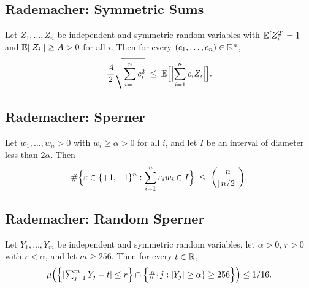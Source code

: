 \subsection{Rademacher: Symmetric Sums}

\begin{theorem}\label{thm:sym-khintchine-app}
Let $Z_1, \dots, Z_n$ be independent and symmetric random variables with
$\mathbb{E}[Z_i^2] = 1$ and $\mathbb{E}[\lvert Z_i \rvert] \ge A > 0$ for all $i$. Then for every
$(c_1, \dots, c_n) \in \mathbb{R}^n$,
\[
\frac{A}{2} \sqrt{\sum_{i=1}^n c_i^2}
\;\le\;
\mathbb{E}\Bigl[\Bigl\lvert \sum_{i=1}^n c_i Z_i \Bigr\rvert\Bigr].
\]
\end{theorem}

\subsection{Rademacher: Sperner}

\begin{theorem}\label{thm:sperner-antichain-app}
Let $w_1, \dots, w_n > 0$ with $w_i \ge \alpha > 0$ for all $i$, and let $I$
be an interval of diameter less than $2\alpha$. Then
\[
\#\Bigl\{\varepsilon \in \{+1,-1\}^n :
  \sum_{i=1}^n \varepsilon_i w_i \in I\Bigr\}
\;\le\;
\binom{n}{\lfloor n/2 \rfloor}.
\]
\end{theorem}

\subsection{Rademacher: Random Sperner}

\begin{theorem}\label{thm:sperner-app}
Let $Y_1, \dots, Y_m$ be independent and symmetric random variables, let
$\alpha > 0$, $r > 0$ with $r < \alpha$, and let $m \ge 256$. Then for every
$t \in \mathbb{R}$,
\[
\mu\Bigl(
  \Bigl\{\lvert \textstyle\sum_{j=1}^m Y_j - t \rvert \le r\Bigr\}
  \cap
  \Bigl\{\#\{j : \lvert Y_j \rvert \ge \alpha\} \ge 256\Bigr\}
\Bigr)
\le 1/16.
\]
\end{theorem}
